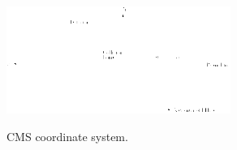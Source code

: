 \begin{figure}[htb]
  \begin{center}
    {\includegraphics[width=0.65\textwidth]{../figs/Exp/CMScoord.png}}
    \caption{CMS coordinate system. }
    \label{fig:CMScoord}
  \end{center}
\end{figure}

